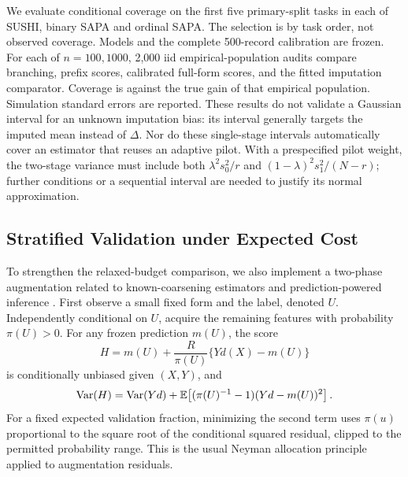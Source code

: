 We evaluate conditional coverage on the first five primary-split tasks
in each of SUSHI, binary SAPA and ordinal SAPA. The selection is by task
order, not observed coverage. Models and the complete 500-record
calibration are frozen. For each of $n=100,1000$, 2,000 iid empirical-population
audits compare branching, prefix scores, calibrated full-form scores,
and the fitted imputation comparator. Coverage is against the true gain of
that empirical population. Simulation standard errors are reported.
These results do not validate a Gaussian interval for an unknown imputation
bias: its interval generally targets the imputed mean instead of $\Delta$.
Nor do these single-stage intervals automatically cover an estimator that
reuses an adaptive pilot. With a prespecified pilot weight, the two-stage
variance must include both $\lambda^2s_0^2/r$ and
$(1-\lambda)^2s_1^2/(N-r)$; further conditions or a sequential interval are
needed to justify its normal approximation.



\subsection{Stratified Validation under Expected Cost}\label{app:validation}
To strengthen the relaxed-budget comparison, we also implement a two-phase
augmentation related to known-coarsening estimators and prediction-powered
inference \citep{robins1994,tao2020,ppi2024}. First observe a small fixed form
and the label, denoted $U$. Independently conditional on $U$, acquire the
remaining features with probability $\pi(U)>0$. For any frozen prediction
$m(U)$, the score
\[
          H=m(U)+\frac{R}{\pi(U)}\{Yd(X)-m(U)\}
\]
is conditionally unbiased given $(X,Y)$, and
\[
 \operatorname{Var}(H)=\operatorname{Var}(Yd)+\mathbb{E}\!\left[(\pi(U)^{-1}-1)(Yd-m(U))^2\right].
\]
For a fixed expected validation fraction, minimizing the second term uses
$\pi(u)$ proportional to the square root of the conditional squared
residual, clipped to the permitted probability range. This is the usual
Neyman allocation principle applied to augmentation residuals.

